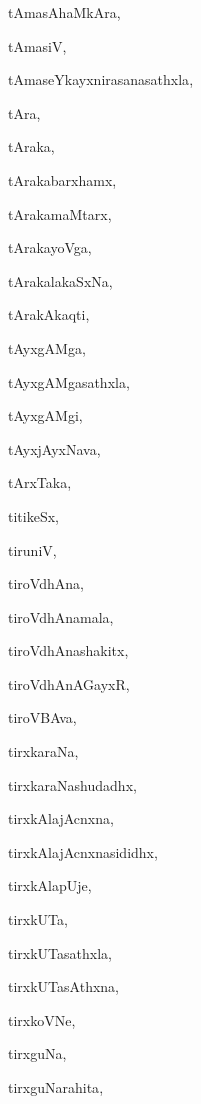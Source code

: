 \begin{multicols}{2}
{tAmasAhaMkAra}, \pageref{tAmasAhaMkAra}

{tAmasiV}, \pageref{tAmasiV}

{tAmaseYkayxnirasanasathxla}, \pageref{tAmaseYkayxnirasanasathxla}

{tAra}, \pageref{tAra}

{tAraka}, \pageref{tAraka}

{tArakabarxhamx}, \pageref{tArakabarxhamx}

{tArakamaMtarx}, \pageref{tArakamaMtarx}

{tArakayoVga}, \pageref{tArakayoVga}

{tArakalakaSxNa}, \pageref{tArakalakaSxNa}

{tArakAkaqti}, \pageref{tArakAkaqti}

{tAyxgAMga}, \pageref{tAyxgAMga}

{tAyxgAMgasathxla}, \pageref{tAyxgAMgasathxla}

{tAyxgAMgi}, \pageref{tAyxgAMgi}

{tAyxjAyxNava}, \pageref{tAyxjAyxNava}

{tArxTaka}, \pageref{tArxTaka}

{titikeSx}, \pageref{titikeSx}

{tiruniV{\ru}}, \pageref{tiruniVru}

{tiroVdhAna}, \pageref{tiroVdhAna}

{tiroVdhAnamala}, \pageref{tiroVdhAnamala}

{tiroVdhAnashakitx}, \pageref{tiroVdhAnashakitx}

{tiroVdhAnAGayxR}, \pageref{tiroVdhAnAGayxR}

{tiroVBAva}, \pageref{tiroVBAva}

{tirxkaraNa}, \pageref{tirxkaraNa}

{tirxkaraNashudadhx}, \pageref{tirxkaraNashudadhx}

{tirxkAlajAcnxna}, \pageref{tirxkAlajAcnxna}

{tirxkAlajAcnxnasididhx}, \pageref{tirxkAlajAcnxnasididhx}

{tirxkAlapUje}, \pageref{tirxkAlapUje}

{tirxkUTa}, \pageref{tirxkUTa}

{tirxkUTasathxla}, \pageref{tirxkUTasathxla}

{tirxkUTasAthxna}, \pageref{tirxkUTasAthxna}

{tirxkoVNe}, \pageref{tirxkoVNe}

{tirxguNa}, \pageref{tirxguNa}

{tirxguNarahita}, \pageref{tirxguNarahita}


\end{multicols}
